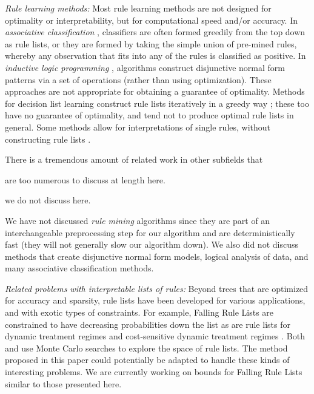 \textit{Rule learning methods:} 
Most rule learning methods are not designed for optimality or interpretability, but for computational speed and/or accuracy. In \textit{associative classification} \citep{Vanhoof10,Liu98,Li01,Yin03}, classifiers are often formed greedily from the top down as rule lists, or they are formed by taking the simple union of pre-mined rules, whereby any observation that fits into any of the rules is classified as positive.
%
In \textit{inductive logic programming} \citep{muggleton1994inductive},
algorithms construct disjunctive normal form patterns via a set of operations
(rather than using optimization).
%
These approaches are not appropriate for obtaining a guarantee of optimality.
%
Methods for decision list learning construct rule lists iteratively in a greedy way
\citep{Rivest87,Sokolova03,Marchand05,RudinLeMa13,Goessling2015};
these too have no guarantee of optimality, and tend not to produce optimal rule lists in general.
%
Some methods allow for interpretations of single rules, without constructing rule lists \citep{McCormick:2011ws}.

There is a tremendous amount of related work in other subfields that
\begin{arxiv}
are too numerous to discuss at length here.
\end{arxiv}
\begin{kdd}
we do not discuss here.
\end{kdd}
We have not discussed \textit{rule mining} algorithms since they are part of an interchangeable preprocessing step for our algorithm and are deterministically fast (\ie they will not generally slow our algorithm down). We also did not discuss methods that create disjunctive normal form models, \eg logical analysis of data, and many associative classification methods. 

\textit{Related problems with interpretable lists of rules:} Beyond trees that are optimized 
for accuracy and sparsity, rule lists have been developed for various applications,
and with exotic types of constraints.
%
For example, Falling Rule Lists \citep{WangRu15} are constrained to have decreasing probabilities down the list as are rule lists for dynamic treatment regimes \citep{ZhangEtAl15} and cost-sensitive dynamic treatment regimes \citep{LakkarajuRu17}. Both \citet{WangRu15} and \citet{LakkarajuRu17} use Monte Carlo searches to explore the space of rule lists. The method proposed in this paper could potentially be adapted to handle these kinds of interesting problems. We are currently working on bounds for Falling Rule Lists \citep{ChenRu17} similar to those presented here.

